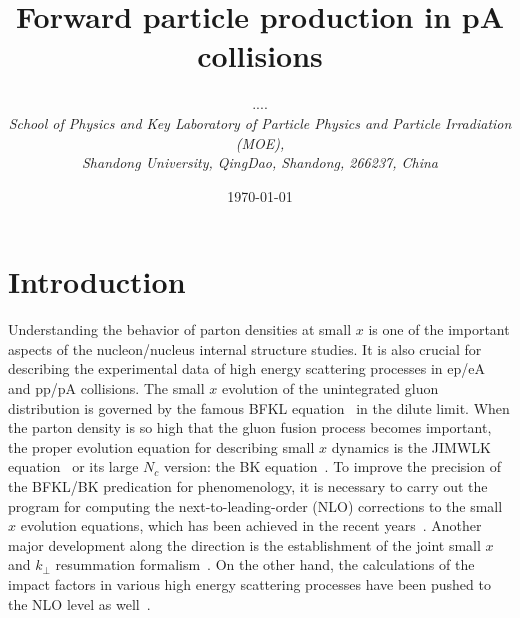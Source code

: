 \documentclass[prd,aps,preprint,tightenlines,nofootinbib,superscriptaddress]{revtex4}
\begin{document}
\title{Forward particle production in pA collisions}

\author{....
 \\[0.3cm]
{\normalsize\it School of Physics and Key Laboratory of Particle Physics and Particle Irradiation (MOE),} \\
  {\normalsize\it Shandong University, QingDao, Shandong, 266237, China}
}

\date{\today}



\section{Introduction} \label{s:intro}
Understanding the behavior of parton densities at small $x$ is one of the important aspects of the nucleon/nucleus internal structure studies.  It is also crucial for describing the experimental data of high energy scattering processes in ep/eA and pp/pA collisions. The small $x$  evolution of the unintegrated gluon distribution is governed by the famous BFKL equation~\cite{Kuraev:1977fs,Balitsky:1978ic} in the dilute limit. When the parton density is so high  that the gluon fusion process becomes important, the proper evolution equation for describing small $x$ dynamics is the JIMWLK equation~\cite{Jalilian-Marian:1997jhx,Jalilian-Marian:1997qno,Jalilian-Marian:1996mkd,Iancu:2001md} or its large $N_c$ version: the BK equation~\cite{Balitsky:1995ub,Kovchegov:1999yj}. To improve the precision of the BFKL/BK predication for phenomenology, it is necessary to carry out the program for computing the next-to-leading-order (NLO) corrections to the small $x$ evolution equations, which has been achieved in the recent years~\cite{Fadin:1996nw,Ciafaloni:1998gs,Balitsky:2007feb,Balitsky:2013fea}. Another major development along the direction is the establishment of the joint small $x$ and $k_\perp$ resummation formalism~\cite{Mueller:2012uf,Mueller:2013wwa,Zhou:2016tfe,Xiao:2017yya,Zhou:2018lfq}. On the other hand, the calculations of the impact factors in various high energy scattering processes have been pushed to the NLO level as well~\cite{Chirilli:2011km,Chirilli:2012jd,Balitsky:2012bs,Beuf:2011xd,Boussarie:2016ogo,Boussarie:2016bkq,Beuf:2017bpd,Hanninen:2017ddy,Roy:2018jxq,Roy:2019hwr,Boussarie:2019ero,Mantysaari:2021ryb,Iancu:2020mos,Beuf:2021qqa,Caucal:2021ent}.
\end{document}
